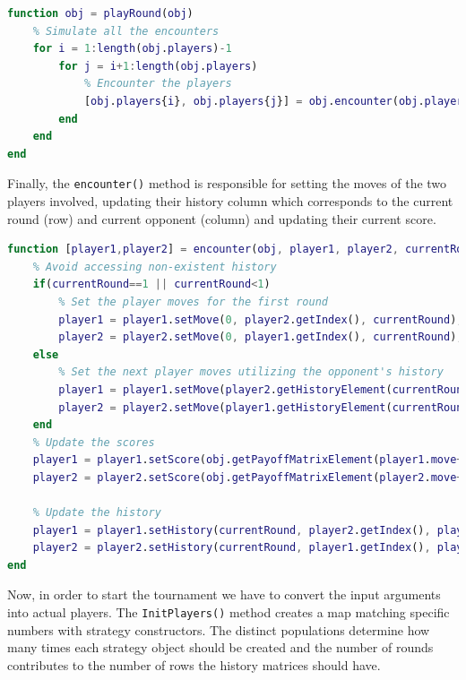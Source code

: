 \documentclass[12pt]{article}
\begin{document}
\begin{lstlisting}[language=Matlab, caption={Full Rounding Logic Implementation}]
% Method to play a round
function obj = playRound(obj)
    % Simulate all the encounters
    for i = 1:length(obj.players)-1
        for j = i+1:length(obj.players)
            % Encounter the players
            [obj.players{i}, obj.players{j}] = obj.encounter(obj.players{i}, obj.players{j}, obj.getCurrentRound());
        end
    end
end
\end{lstlisting}

Finally, the \texttt{encounter()} method is responsible for setting the moves of the two players involved, updating their history column which corresponds to the current round (row) and current opponent (column) and updating their current score.
\begin{lstlisting}[language=Matlab, caption={Full Rounding Logic Implementation}]
% Method to encounter two players
function [player1,player2] = encounter(obj, player1, player2, currentRound)
    % Avoid accessing non-existent history
    if(currentRound==1 || currentRound<1)
        % Set the player moves for the first round 
        player1 = player1.setMove(0, player2.getIndex(), currentRound); % First round
        player2 = player2.setMove(0, player1.getIndex(), currentRound); % First round
    else
        % Set the next player moves utilizing the opponent's history
        player1 = player1.setMove(player2.getHistoryElement(currentRound-1,player1.getIndex()), player2.getIndex(), currentRound); % Previous round row 
        player2 = player2.setMove(player1.getHistoryElement(currentRound-1,player2.getIndex()), player1.getIndex(), currentRound); % Opponent's index column
    end
    % Update the scores
    player1 = player1.setScore(obj.getPayoffMatrixElement(player1.move+1, player2.move+1));
    player2 = player2.setScore(obj.getPayoffMatrixElement(player2.move+1, player1.move+1));

    % Update the history
    player1 = player1.setHistory(currentRound, player2.getIndex(), player1.getMove());
    player2 = player2.setHistory(currentRound, player1.getIndex(), player2.getMove());
end
\end{lstlisting}
Now, in order to start the tournament we have to convert the input arguments into actual players. The \texttt{InitPlayers()} method creates a map matching specific numbers with strategy constructors. The distinct populations determine how many times each strategy object should be created and the number of rounds contributes to the number of rows the history matrices should have.
\end{document}
